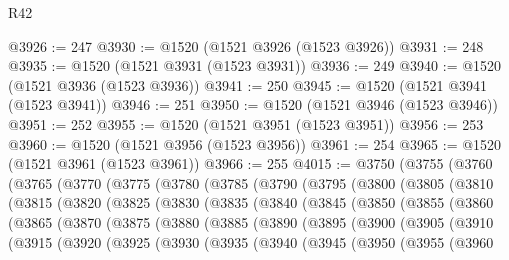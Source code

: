\begin{lexlean}{R42}
\begin{coremodule}
{@3926 := 247
@3930 := @1520 (@1521 @3926 (@1523 @3926))
@3931 := 248
@3935 := @1520 (@1521 @3931 (@1523 @3931))
@3936 := 249
@3940 := @1520 (@1521 @3936 (@1523 @3936))
@3941 := 250
@3945 := @1520 (@1521 @3941 (@1523 @3941))
@3946 := 251
@3950 := @1520 (@1521 @3946 (@1523 @3946))
@3951 := 252
@3955 := @1520 (@1521 @3951 (@1523 @3951))
@3956 := 253
@3960 := @1520 (@1521 @3956 (@1523 @3956))
@3961 := 254
@3965 := @1520 (@1521 @3961 (@1523 @3961))
@3966 := 255
@4015 := @3750
    (@3755
      (@3760
        (@3765
          (@3770
            (@3775
              (@3780
                (@3785
                  (@3790
                    (@3795
                      (@3800
                        (@3805
                          (@3810
                            (@3815
                              (@3820
                                (@3825
                                  (@3830
                                    (@3835
                                      (@3840
                                        (@3845
                                          (@3850
                                            (@3855
                                              (@3860
                                                (@3865
                                                  (@3870
                                                    (@3875
                                                      (@3880
                                                        (@3885
                                                          (@3890
                                                            (@3895
                                                              (@3900
                                                                (@3905
                                                                  (@3910
                                                                    (@3915
                                                                      (@3920
                                                                        (@3925
                                                                          (@3930
                                                                            (@3935
                                                                              (@3940
                                                                                (@3945
                                                                                  (@3950
                                                                                    (@3955
                                                                                      (@3960
}
\end{coremodule}
\end{lexlean}
